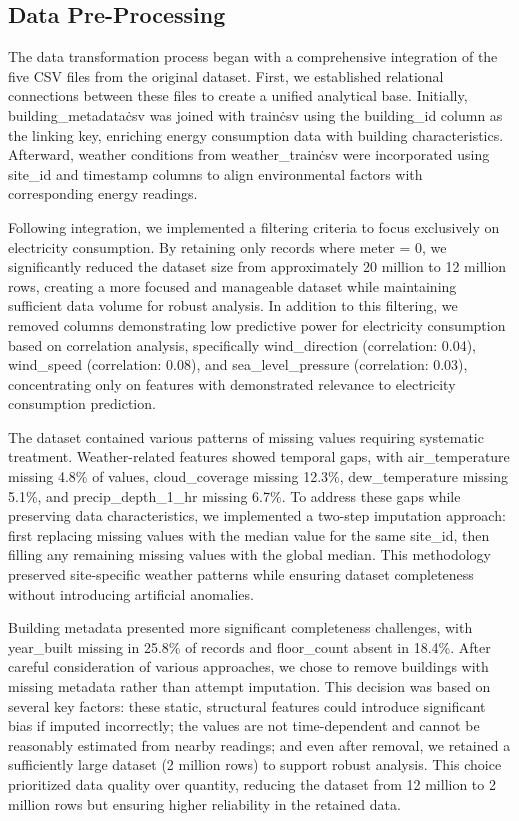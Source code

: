 \subsection{Data Pre-Processing}

The data transformation process began with a comprehensive integration of the five CSV files from the original dataset. First, we established relational connections between these files to create a unified analytical base. Initially, building\_metadata\.csv was joined with train\.csv using the building\_id column as the linking key, enriching energy consumption data with building characteristics. Afterward, weather conditions from weather\_train\.csv were incorporated using site\_id and timestamp columns to align environmental factors with corresponding energy readings. 

Following integration, we implemented a filtering criteria to focus exclusively on electricity consumption. By retaining only records where meter = 0, we significantly reduced the dataset size from approximately 20 million to 12 million rows, creating a more focused and manageable dataset while maintaining sufficient data volume for robust analysis. In addition to this filtering, we removed columns demonstrating low predictive power for electricity consumption based on correlation analysis, specifically wind\_direction (correlation: 0.04), wind\_speed (correlation: 0.08), and sea\_level\_pressure (correlation: 0.03), concentrating only on features with demonstrated relevance to electricity consumption prediction.

The dataset contained various patterns of missing values requiring systematic treatment. Weather-related features showed temporal gaps, with air\_temperature missing 4.8\% of values, cloud\_coverage missing 12.3\%, dew\_temperature missing 5.1\%, and precip\_depth\_1\_hr missing 6.7\%. To address these gaps while preserving data characteristics, we implemented a two-step imputation approach: first replacing missing values with the median value for the same site\_id, then filling any remaining missing values with the global median. This methodology preserved site-specific weather patterns while ensuring dataset completeness without introducing artificial anomalies.

Building metadata presented more significant completeness challenges, with year\_built missing in 25.8\% of records and floor\_count absent in 18.4\%. After careful consideration of various approaches, we chose to remove buildings with missing metadata rather than attempt imputation. This decision was based on several key factors: these static, structural features could introduce significant bias if imputed incorrectly; the values are not time-dependent and cannot be reasonably estimated from nearby readings; and even after removal, we retained a sufficiently large dataset (2 million rows) to support robust analysis. This choice prioritized data quality over quantity, reducing the dataset from 12 million to 2 million rows but ensuring higher reliability in the retained data.

